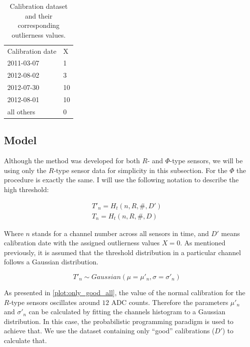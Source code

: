 \begin{table}[h]
\caption{\label{data-table} Calibration dataset and their corresponding outlierness values.}
\begin{center}
\begin{tabular}{ll}
Calibration date& X\\
2011-03-07&1\\
2012-08-02&3\\
2012-07-30&10\\
2012-08-01&10\\
all others&0\\
\end{tabular}
\end{center}
\end{table}

\subsection{Model}

Although the method was developed for both $R$- and $\Phi$-type sensors, we will be using only the $R$-type sensor data for simplicity in this subsection. For the $\Phi$ the procedure is exactly the same. I will use the following notation to describe the high threshold:


\begin{align}
  T\prime_n = H_{t}(n, R, \#, D\prime) \\
  T_n = H_{t}(n, R, \#, D)
  \label{eq:notation}
  \end{align}

  Where $n$ stands for a channel number across all sensors in time, and $D\prime$ means calibration date with the assigned outlierness values $X=0$.
As mentioned previously, it is assumed that the threshold distribution in a particular channel follows a Gaussian distribution.

\begin{equation}
    T\prime_n \sim Gaussian(\mu=\mu\prime_n, \sigma=\sigma\prime_n)
  \label{eq:basic-model}
  \end{equation}

As presented in \ref{plot:only_good_all}, the value of the normal calibration for the $R$-type sensors oscillates around $12$ ADC counts.
Therefore the parameters $\mu\prime_{n}$ and $\sigma\prime_{n}$ can be calculated by fitting the channels histogram to a Gaussian distribution.
In this case, the probabilistic programming paradigm is used to achieve that. We use the dataset containing only ``good'' calibrations ($D\prime$) to calculate that.

